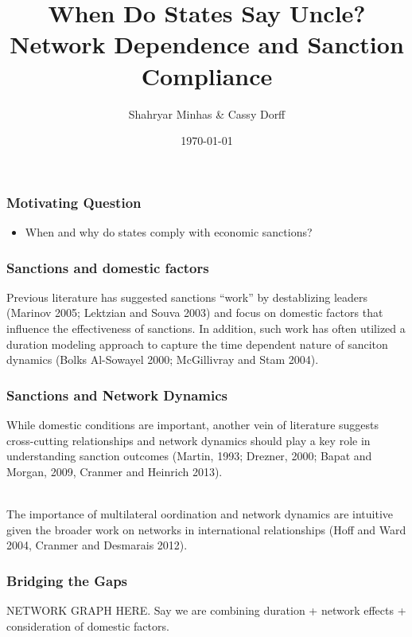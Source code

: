 \documentclass{beamer}
\title[When Do States Say Uncle? \hspace{14em} \insertframenumber/
\inserttotalframenumber]{When Do States Say Uncle? Network Dependence and Sanction Compliance}
\author{Shahryar Minhas \& Cassy Dorff}
\institute[Duke University]
{
{\emph{shahryar.minhas@duke.edu \& cassy.dorff@duke.edu}} \\
\medskip
Duke University 
}
\date{\today}
\begin{document}
\begin{frame}
\titlepage
\end{frame}

\begin{frame}
\frametitle{Motivating Question}

\begin{itemize}
	\item When and why do states comply with economic sanctions? 
\end{itemize}

\end{frame}

\begin{frame}
\frametitle{Sanctions and domestic factors}
Previous literature has suggested sanctions ``work'' by destablizing leaders (Marinov 2005; Lektzian and Souva 2003) and focus on domestic factors that influence the effectiveness of sanctions. In addition, such work has often utilized a duration modeling approach to capture the time dependent nature of sanciton dynamics (Bolks Al-Sowayel 2000; McGillivray and Stam 2004).
\end{frame}

\begin{frame}
\frametitle{Sanctions and Network Dynamics}
While domestic conditions are important, another vein of literature suggests cross-cutting relationships and network dynamics should play a key role in understanding sanction outcomes (Martin, 1993; Drezner, 2000; Bapat and Morgan, 2009, Cranmer and Heinrich 2013). 

~\\

The importance of multilateral oordination and network dynamics are intuitive given the broader work on networks in international relationships (Hoff and Ward 2004, Cranmer and Desmarais 2012). 
\end{frame}

\begin{frame}
\frametitle{Bridging the Gaps}
NETWORK GRAPH HERE. Say we are combining duration + network effects + consideration of domestic factors. 
\end{frame}
\end{document}
